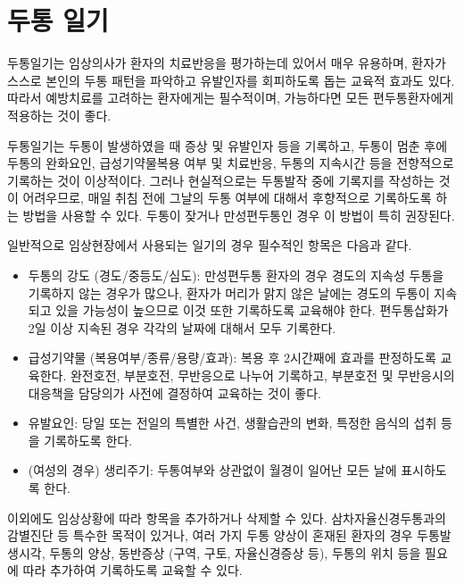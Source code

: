\documentclass[]{book}
\begin{document}
\cleardoublepage

\hypertarget{appendix-appendix}{%
\appendix}


\hypertarget{section-21}{%
\chapter{두통 일기}\label{section-21}}

두통일기는 임상의사가 환자의 치료반응을 평가하는데 있어서 매우 유용하며, 환자가 스스로 본인의 두통 패턴을 파악하고 유발인자를 회피하도록 돕는 교육적 효과도 있다. 따라서 예방치료를 고려하는 환자에게는 필수적이며, 가능하다면 모든 편두통환자에게 적용하는 것이 좋다.

두통일기는 두통이 발생하였을 때 증상 및 유발인자 등을 기록하고, 두통이 멈춘 후에 두통의 완화요인, 급성기약물복용 여부 및 치료반응, 두통의 지속시간 등을 전향적으로 기록하는 것이 이상적이다. 그러나 현실적으로는 두통발작 중에 기록지를 작성하는 것이 어려우므로, 매일 취침 전에 그날의 두통 여부에 대해서 후향적으로 기록하도록 하는 방법을 사용할 수 있다. 두통이 잦거나 만성편두통인 경우 이 방법이 특히 권장된다.

일반적으로 임상현장에서 사용되는 일기의 경우 필수적인 항목은 다음과 같다.

\begin{itemize}
\item
  두통의 강도 (경도/중등도/심도): 만성편두통 환자의 경우 경도의 지속성 두통을 기록하지 않는 경우가 많으나, 환자가 머리가 맑지 않은 날에는 경도의 두통이 지속되고 있을 가능성이 높으므로 이것 또한 기록하도록 교육해야 한다. 편두통삽화가 2일 이상 지속된 경우 각각의 날짜에 대해서 모두 기록한다.
\item
  급성기약물 (복용여부/종류/용량/효과): 복용 후 2시간째에 효과를 판정하도록 교육한다. 완전호전, 부분호전, 무반응으로 나누어 기록하고, 부분호전 및 무반응시의 대응책을 담당의가 사전에 결정하여 교육하는 것이 좋다.
\item
  유발요인: 당일 또는 전일의 특별한 사건, 생활습관의 변화, 특정한 음식의 섭취 등을 기록하도록 한다.
\item
  (여성의 경우) 생리주기: 두통여부와 상관없이 월경이 일어난 모든 날에 표시하도록 한다.
\end{itemize}

이외에도 임상상황에 따라 항목을 추가하거나 삭제할 수 있다. 삼차자율신경두통과의 감별진단 등 특수한 목적이 있거나, 여러 가지 두통 양상이 혼재된 환자의 경우 두통발생시각, 두통의 양상, 동반증상 (구역, 구토, 자율신경증상 등), 두통의 위치 등을 필요에 따라 추가하여 기록하도록 교육할 수 있다.
\end{document}
